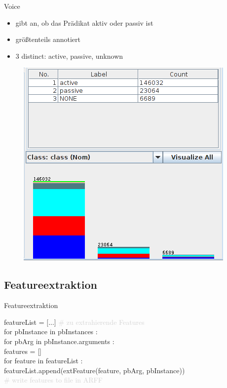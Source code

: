 \documentclass[10pt]{beamer}
\begin{document}
  \begin{frame}{Voice}
   \begin{itemize}
    \item gibt an, ob das Prädikat aktiv oder passiv ist
    \item größtenteils annotiert
    \item 3 distinct: active, passive, unknown
   \end{itemize}
  \begin{figure}
	  \begin{center}
	  	\includegraphics[scale=0.3]{voice}
	  \end{center}
  \end{figure}
  \end{frame}
  



\subsection{Featureextraktion}

\begin{frame}{Featureextraktion} 
\begin{small}
\hspace{10pt} featureList = $[$...$]$ \textcolor{lightgray}{\# zu extrahierende Features} \\
\hspace{10pt} for pbInstance in pbInstances : \\
\hspace{30pt} 	for pbArg in pbInstance.arguments : \\
\hspace{30pt} 	features = [] \\
\hspace{30pt} 	for feature in featureList : \\
\hspace{50pt}	  featureList.append(extFeature(feature, pbArg, pbInstance)) \\
\hspace{10pt}   	\textcolor{lightgray}{ \# write features to file in ARFF} \\
\end{small}
\end{frame}
\end{document}
